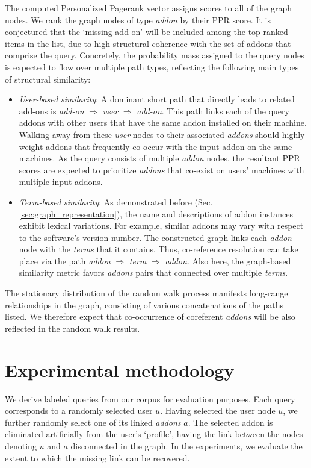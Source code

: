 \documentclass[11pt,oneside]{book}
\let\Oldsection\section
\renewcommand{\section}{\FloatBarrier\Oldsection}
\begin{document}
The computed Personalized Pagerank vector assigns scores to all of the
graph nodes. We rank the graph nodes of type {\it addon} by their PPR score. It is conjectured that the `missing add-on' will be included among the top-ranked items in the list, due to high structural coherence with the set of addons that comprise the query. Concretely, the probability mass assigned to the query nodes is expected to flow over multiple path types, reflecting the following main types of structural similarity:
\begin{itemize}
\item {\it User-based similarity}: A dominant short path that
  directly leads to related add-ons is {\it add-on} $\Rightarrow$ {\it user}
   $\Rightarrow$ {\it add-on}. This path links each of the query addons
  with other users that have the same addon installed on their
  machine. Walking away from these {\it user} nodes to their associated
  {\it addons} should highly weight addons that frequently
  co-occur with the input addon on the same machines. As the query consists of multiple {\it addon} nodes, the resultant PPR scores are expected to prioritize {\it addons} that co-exist on users' machines with multiple input addons.   
\item {\it Term-based similarity}: As demonstrated before
  (Sec. \autoref{sec:graph_representation}), the name and descriptions of addon
  instances exhibit lexical variations. For example, similar addons may vary with respect to the software's version number. The constructed graph links each {\it addon} node with the {\it terms} that it contains. Thus, co-reference resolution can take place via the path {\it addon}
  $\Rightarrow$ {\it term} $\Rightarrow$ {\it addon}. Also here, the graph-based similarity metric favors {\it addons} pairs that connected over multiple {\it terms}. 
\end{itemize}

The stationary distribution of the random walk process manifests long-range relationships in the graph, consisting of various concatenations of the paths listed. We therefore expect that co-occurrence of coreferent {\it addons} will be also reflected in the random walk results.


\section{Experimental methodology}

We derive labeled queries from our corpus for evaluation purposes.  Each query corresponds to a randomly selected user $u$. Having selected the user node $u$, we further randomly select one of its linked {\it addons} $a$. The selected addon is eliminated artificially from the user's `profile', having the link between the nodes denoting $u$ and $a$ disconnected in the graph. In
the experiments, we evaluate the extent to which the missing link can
be recovered. 
\end{document}

